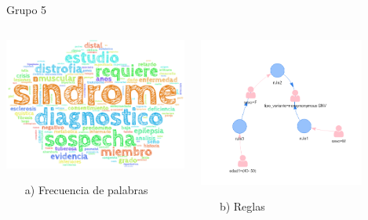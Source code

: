 \documentclass[xcolor=dvipsnames]{beamer}
\begin{document}
\begin{frame}{Grupo 5}
\begin{columns}
\begin{column}{0.5\textwidth}
\begin{center}
\includegraphics[width=1\textwidth]{cluster5} \\
\begin{itemize}
    \item[a)] Frecuencia de palabras
\end{itemize}
\end{center}
\end{column}
\begin{column}{0.5\textwidth}  %
    \begin{center}
     \includegraphics[width=0.8\textwidth]{reglas5_2.png}
    \begin{itemize}
    \centering
    \item[b)] Reglas
    \end{itemize}
    \end{center}
\end{column}
\end{columns}
\end{frame}
\end{document}
